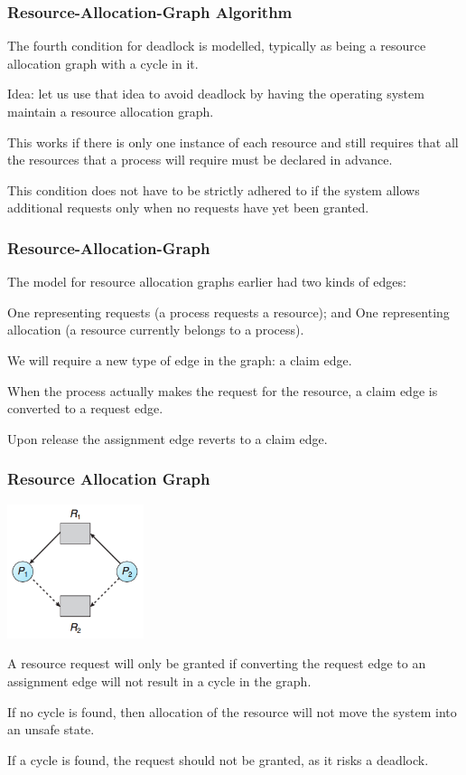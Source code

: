 \begin{frame}
\frametitle{Resource-Allocation-Graph Algorithm}

The fourth condition for deadlock is modelled, typically as being a resource allocation graph with a cycle in it. 

Idea: let us use that idea to avoid deadlock by having the operating system maintain a resource allocation graph. 

This works if there is only one instance of each resource and still requires that all the resources that a process will require must be declared in advance. 

This condition does not have to be strictly adhered to if the system allows additional requests only when no requests have yet been granted.

\end{frame}

\begin{frame}
\frametitle{Resource-Allocation-Graph}

The model for resource allocation graphs earlier had two kinds of edges:

One representing requests (a process requests a resource); and
One representing allocation (a resource currently belongs to a process). 

We will require a new type of edge in the graph: a \alert{claim} edge. 

When the process actually makes the request for the resource, a claim edge is converted to a request edge. 

Upon release the assignment edge reverts to a claim edge.
\end{frame}

\begin{frame}
\frametitle{Resource Allocation Graph}

\begin{center}
\includegraphics[width=0.3\textwidth]{images/resource-allocation-graph-claim.png}
\end{center}

A resource request will only be granted if converting the request edge to an assignment edge will not result in a cycle in the graph.

If no cycle is found, then allocation of the resource will not move the system into an unsafe state. 

If a cycle is found, the request should not be granted, as it risks a deadlock.

\end{frame}

